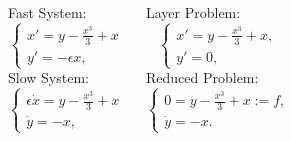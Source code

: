 \documentclass[25pt, a0paper, portrait]{tikzposter}
\begin{document}
\begin{columns}
{Fast System:
\begin{equation*}\label{fastsystem}
    \begin{cases} x'=y-\frac{x^3}{3}+x\\
    y'=-\epsilon x,
    \end{cases}
\end{equation*}
Slow System: 
\begin{equation*}\label{slowsystem}
    \begin{cases} \epsilon \dot{x}=y-\frac{x^3}{3}+x\\
    \dot{y}=-x,
    \end{cases}
\end{equation*}
}
{
Layer Problem:
\begin{equation*}\label{fastsystem0}
    \begin{cases} x'=y-\frac{x^3}{3}+x,\\
    y'=0,
    \end{cases}
\end{equation*}
Reduced Problem:
\begin{equation*}\label{slowsystem0}
    \begin{cases} 0=y-\frac{x^3}{3}+x:=f,\\
    \dot{y}=-x.
    \end{cases}
\end{equation*}

}
 
{

}
\end{columns}
\end{document}

